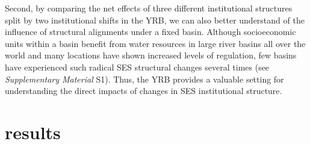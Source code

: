 Second, by comparing the net effects of three different institutional structures split by two institutional shifts in the YRB, we can also better understand of the influence of structural alignments under a fixed basin. Although socioeconomic units within a basin benefit from water resources in large river basins all over the world and many locations have shown increased levels of regulation, few basins have experienced such radical SES structural changes several times (see \textit{Supplementary Material} S1). Thus, the YRB provides a valuable setting for understanding the direct impacts of changes in SES institutional structure.


\section{results}



